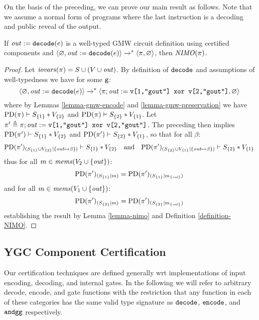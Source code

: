 On the basis of the preceding, we can prove our main result as
follows. Note that we assume a normal form of programs where the last
instruction is a decoding and public reveal of the output.
\begin{theorem}
  \label{theorem-gmw-NIMO}
  If $\mathit{out} := \texttt{decode}(e)$ is a well-typed GMW circuit
  definition using certified components and
  $\langle \varnothing,\mathit{out} := \texttt{decode}(e) \rangle \xrightarrow{}^{*}
  \langle \pi,\varnothing \rangle$, then $\mathit{NIMO}(\pi)$.
\end{theorem}
\begin{proof}
  Let $\mathit{iovars}(\pi) = S \cup (V \cup \mathit{out})$. By definition of $\texttt{decode}$
  and assumptions of well-typedness we have for some $\texttt{g}$:
  $$
  \langle \varnothing,\mathit{out} := \texttt{decode}(e) \rangle \xrightarrow{}^{*}
  \langle \pi;\mathit{out} := \texttt{v[1,"gout"] xor v[2,"gout"]},\varnothing \rangle
  $$
  where by Lemmas \ref{lemma-gmw-encode} and \ref{lemma-gmw-preservation} we
  have $\mathrm{PD}(\pi) \vdash S_{\{1\}} * V_{\{2\}}$ and
  $\mathrm{PD}(\pi) \vdash S_{\{2\}} * V_{\{1\}}$.
  Let $\pi' \triangleq \pi;\mathit{out} := \texttt{v[1,"gout"] xor v[2,"gout"]}$. The
  preceding then implies
  $\mathrm{PD}(\pi') \vdash S_{\{1\}} * V_{\{2\}}$ and
  $\mathrm{PD}(\pi') \vdash S_{\{2\}} * V_{\{1\}}$,
  so that for all $\beta$:
  $$\mathrm{PD}(\pi')_{({S_{\{1\}} \cup V_{\{2\}}}|{\{ \mathit{out} \mapsto \beta \}})} \vdash S_{\{1\}} * V_{\{2\}}
  \quad \text{and} \quad
    \mathrm{PD}(\pi')_{({S_{\{2\}} \cup V_{\{1\}}}|{\{ \mathit{out} \mapsto \beta \}})} \vdash S_{\{2\}} * V_{\{1\}}$$
  thus for all $m \in \mathit{mems}(V_2 \cup \{ \mathit{out} \})$:
  $$\mathrm{PD}(\pi')_{({S_{\{1\}}}|{m})}
  = \mathrm{PD}(\pi')_{({S_{\{1\}}}|{m_{\{\mathit{out}\}}})}$$
  and for all $m \in \mathit{mems}(V_1 \cup \{ \mathit{out} \})$:
  $$\mathrm{PD}(\pi')_{({S_{\{2\}}}|{m})}
  = \mathrm{PD}(\pi')_{({S_{\{2\}}}|{m_{\{\mathit{out}\}}})}$$
  establishing the result by Lemma \ref{lemma-nimo} and Definition \ref{definition-NIMO}. 
\end{proof}

\subsection{YGC Component Certification}
\label{section-ygc-certification}

Our certification techniques are defined generally wrt implementations
of input encoding, decoding, and internal gates. In the following we
will refer to arbitrary decode, encode, and gate functions with the
restriction that any function in each of these categories has the same
valid type signature as $\texttt{decode}$, $\texttt{encode}$, and
$\texttt{andgg}$ respectively.

